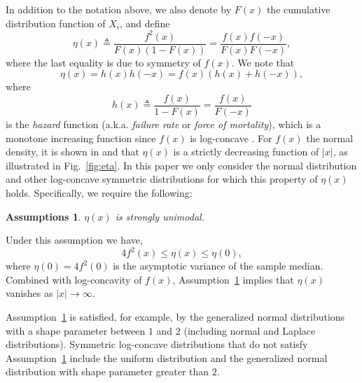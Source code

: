 \documentclass[letterpaper, 11pt]{IEEEtran}      %
\newtheorem{assump}{\bf {Assumptions}}
\begin{document}
In addition to the notation above, we also denote by $F(x)$ the cumulative distribution function of $X_i$, and define
\begin{equation} \label{eq:eta_def}
\eta(x) \triangleq \frac{f^2(x)}{F(x)(1-F(x))} =  \frac{f(x)f(-x)}{F(x)F(-x)}, 
\end{equation}
where the last equality is due to symmetry of $f(x)$. We note that 
\begin{equation}
\label{eq:eta_h}
\eta(x) = h(x)h(-x) = f(x) \left( h(x) + h(-x) \right), 
\end{equation}
where 
\[
h(x) \triangleq \frac{f(x)}{1-F(x)} = \frac{f(x)}{F(-x)}
\]
is the \emph{hazard} function (a.k.a. \emph{failure rate} or \emph{force of mortality}), which is a monotone increasing function since $f(x)$ is log-concave \cite{bagnoli2005log}. 
%
For $f(x)$ the normal density, it is shown in \cite{Samford1953} and \cite{hammersley1950estimating} that $\eta(x)$ is a strictly decreasing function of $|x|$, as illustrated in Fig.~\ref{fig:eta}. 
%
In this paper we only consider the normal distribution and other log-concave symmetric distributions for which this property of $\eta(x)$ holds. Specifically, we require the following:
\begin{assump} \label{assump:failure_rate}
 $\eta(x)$ is strongly unimodal. 
\end{assump}
Under this assumption we have, 
\[
4f^2(x) \leq \eta(x) \leq \eta(0),
\] 
%
where $\eta(0) = 4 f^2(0)$ is the asymptotic variance of the sample median. Combined with log-concavity of $f(x)$, Assumption~\ref{assump:failure_rate} implies that $\eta(x)$ vanishes as $|x|\rightarrow \infty$. \par
%
Assumption~\ref{assump:failure_rate} is satisfied, for example, by the generalized normal distributions with a shape parameter between $1$ and $2$ (including normal and Laplace distributions). Symmetric log-concave distributions that do not satisfy Assumption~\ref{assump:failure_rate} include the uniform distribution and the generalized normal distribution with shape parameter greater than $2$.
\\
\end{document}
